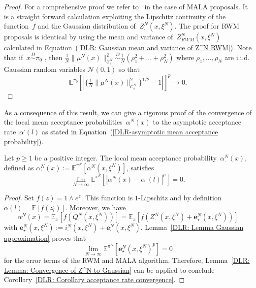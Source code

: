 \begin{proof}
  For a comprehensive proof we refer to~\autocite[Lemma 4.5]{Pillai2012} in the case of MALA proposals. It is a straight forward calculation exploiting the Lipschitz continuity of the function~$f$ and the Gaussian distribution of~$Z^N_{\cdot} (x, \xi^N)$. The proof for RWM proposals is identical  by using the mean and variance of~$Z^N_{RWM} (x, \xi^N)$ calculated in Equation~(\ref{DLR: Gaussian mean and variance of Z^N RWM}). Note that if~$x \stackrel{D}{\sim} \pi_0$ , then $\tfrac{1}{N}\|\mu^N(x)\|_{\mathcal{C}^N_s}^2 \stackrel{D}{\sim} \frac{1}{N}(\rho_1^2 + \dots + \rho_N^2)$ where $\rho_1 , \dots , \rho_N$ are i.i.d.\,Gaussian random variables $\mathcal{N}(0,1)$ so that 
  \begin{equation*}
  \mathbb{E}^{\pi_0}[| \{\tfrac{1}{N} \|\mu^N(x)\|_{\mathcal{C}^N_s}^2 \}^{1/2} - 1 |]^p \to 0.
  \end{equation*}

\end{proof}


As a consequence of this result, we can give a rigorous proof of the convergence of the local mean acceptance probabilities~$\alpha^N(x)$ to the asymptotic acceptance rate~$\alpha^{\cdot}(l)$ as stated in Equation~(\ref{DLR-asymptotic mean acceptance probability}).

\begin{cor}\autocite[Corollary 4.6]{Pillai2012}
  \label{DLR: Corollary acceptance rate convergence}
 Let $p \geq 1$ be a positive integer. The local mean acceptance probability~$\alpha^N_{\cdot}(x)$, defined as $\alpha^N_{\cdot}(x) := \mathbb{E}^{\pi^N} \left[ \alpha^N(x, \xi^N) \right]$, satisfies
 \begin{equation*}
   \lim_{N \to \infty}\mathbb{E}^{\pi^N} \left[ |\alpha^N_{\cdot}(x) - \alpha^{\cdot}(l)|^p \right] = 0.
 \end{equation*}

\end{cor}

\begin{proof}
  Set $f(z) = 1 \wedge e^z$. This function is $1$-Lipschitz and by definition~$\alpha(l) = \mathbb{E}[f(z_l^{\cdot})]$. Moreover, we have
  \begin{equation*}
    \alpha^N(x) = \mathbb{E}_x[f(Q^N_{\cdot}(x, \xi^N))] = \mathbb{E}_x[f( Z^N_{\cdot}(x, \xi^N) + \textbf{e}^N_{\star}(x, \xi^N) )]
  \end{equation*}
  with $\textbf{e}^N_{\star}(x, \xi^N) := i_{\cdot}^N(x, \xi^N) + \textbf{e}^N_{\cdot}(x, \xi^N)$. Lemma~\ref{DLR: Lemma Gaussian approximation} proves that 
  \begin{equation*}
   \lim_{N \to \infty}\mathbb{E}^{\pi^N}[ \textbf{e}^N_{\star}(x, \xi^N)^p] =0
  \end{equation*}
  for the error terms of the RWM and MALA algorithm. Therefore, Lemma~\ref{DLR: Lemma: Convergence of Z^N to Gaussian} can be applied to conclude Corollary~\ref{DLR: Corollary acceptance rate convergence}.

\end{proof}

